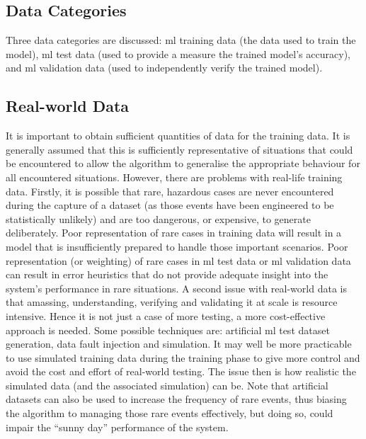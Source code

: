 \subsection{Data Categories}
Three data categories are discussed: \cbstart\gls{ml} training data (the data used to train the model)\cbend,
\gls{ml} test data (used to provide a measure the trained model’s \gls{accuracy}), and \gls{ml}
validation data (used to independently verify the trained model).  

\subsection{Real-world Data}
It is important to obtain sufficient quantities of data for the training data. It is generally assumed that this is sufficiently representative of situations that could be encountered to allow the algorithm to generalise the appropriate behaviour for all encountered situations.  However, there are problems with real-life training data. Firstly, it is possible that rare, hazardous cases are never encountered during the capture of a \gls{dataset} (as those events have been engineered to be statistically unlikely) and are too dangerous, or expensive, to generate deliberately. Poor representation of rare cases in training data will result in a model that is insufficiently prepared to handle those important scenarios. Poor representation (or weighting) of rare cases in
\gls{ml} test data or \gls{ml}
validation data can result in error heuristics that do not provide adequate insight into the system’s performance in rare situations. A second issue with real-world data is that amassing, understanding, verifying and validating it at scale is resource intensive.
Hence it is not just a case of more testing, a more cost-effective approach is needed. Some possible techniques are: artificial
\gls{ml}
test \gls{dataset} generation, data fault injection and simulation. It may well be more practicable to use simulated training data during the training phase to give more control and avoid the cost and effort of real-world testing. The issue then is how realistic the simulated data (and the associated simulation) can be. Note that artificial \glspl{dataset} can also be used to increase the frequency of rare events, thus biasing the algorithm to managing those rare events effectively, but doing so, could impair the ``sunny day'' performance of the system.

